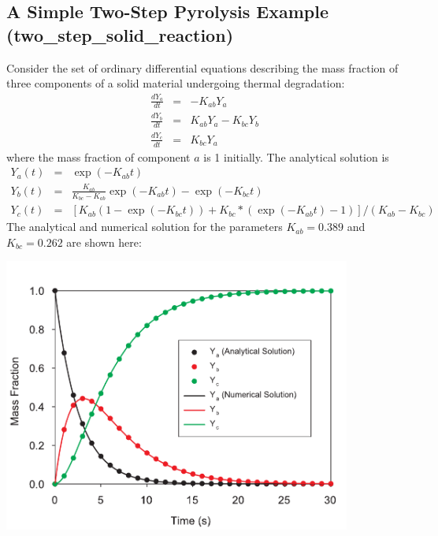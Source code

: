 \documentclass[11pt]{book}
\begin{document}
\clearpage

\subsection{A Simple Two-Step Pyrolysis Example ({\bf two\_step\_solid\_reaction}) }

Consider  the set  of ordinary  differential equations  describing the
mass  fraction of  three  components of  a  solid material  undergoing
thermal degradation:
\begin{eqnarray}
    \frac{dY_a}{dt} &=&  -K_{ab} Y_a \nonumber  \\
    \frac{dY_b}{dt} &=&   K_{ab} Y_a  -  K_{bc}  Y_b  \\
    \frac{dY_c}{dt} &=&   K_{bc} Y_a
    \nonumber
\end{eqnarray}
where  the  mass  fraction  of  component  $a$  is  1  initially.  The
analytical solution is~\cite{Lautenberger:2006}
\begin{eqnarray}
    Y_a(t)    &=&    \exp(-K_{ab}t)    \nonumber   \\
    Y_b(t)    &=&    \frac{K_{ab}}{K_{bc}-K_{ab}} \exp(-K_{ab} t)  - \exp(-K_{bc} t) \\
    Y_c(t)    &=&    \left[   K_{ab}    (1-\exp(-K_{bc} t) )    +  K_{bc}*(\exp(-K_{ab} t) -1) \right] / (K_{ab}-K_{bc})
\end{eqnarray}
The analytical and  numerical solution
for the parameters $K_{ab} = 0.389$ and $K_{bc} = 0.262$ are shown here:

\begin{center}
\includegraphics[width=4.5in]{FIGURES/two_step_solid_reaction_Mass_Fractions}
\end{center}
\end{document}
